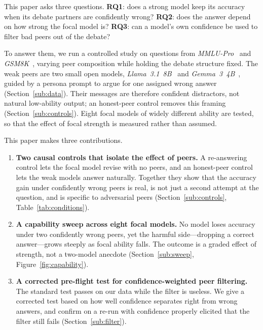 \documentclass[11pt]{article}
\begin{document}
This paper asks three questions.
\textbf{RQ1}: does a strong model keep its accuracy when its debate
partners are confidently wrong?
\textbf{RQ2}: does the answer depend on how strong the focal model is?
\textbf{RQ3}: can a model's own confidence be used to filter bad peers out
of the debate?

To answer them, we run a controlled study on questions from
\textit{MMLU-Pro}~\citep{wang2024mmlupro} and
\textit{GSM8K}~\citep{cobbe2021training}, varying peer composition while
holding the debate structure fixed.
The weak peers are two small open models,
\textit{Llama~3.1~8B}~\citep{meta2024llama3} and
\textit{Gemma~3~4B}~\citep{gemma2025technical}, guided by a persona prompt
to argue for one assigned wrong answer (Section~\ref{sub:data}).
Their messages are therefore confident distractors, not natural
low-ability output; an honest-peer control removes this framing
(Section~\ref{sub:controls}).
Eight focal models of widely different ability are tested, so that the
effect of focal strength is measured rather than assumed.

This paper makes three contributions.
\begin{enumerate}
    \item \textbf{Two causal controls that isolate the effect of peers.}
          A re-answering control lets the focal model revise with no peers,
          and an honest-peer control lets the weak models answer naturally.
          Together they show that the accuracy gain under confidently wrong
          peers is real, is not just a second attempt at the question, and
          is specific to adversarial peers
          (Section~\ref{sub:controls}, Table~\ref{tab:conditions}).
    \item \textbf{A capability sweep across eight focal models.}
          No model loses accuracy under two confidently wrong peers, yet the
          harmful side---dropping a correct answer---grows steeply as focal
          ability falls.
          The outcome is a graded effect of strength, not a two-model
          anecdote (Section~\ref{sub:sweep}, Figure~\ref{fig:capability}).
    \item \textbf{A corrected pre-flight test for confidence-weighted peer
          filtering.} The standard test passes on our data while the filter
          is useless.
          We give a corrected test based on how well confidence separates
          right from wrong answers, and confirm on a re-run with confidence
          properly elicited that the filter still fails
          (Section~\ref{sub:filter}).
\end{enumerate}
\end{document}

